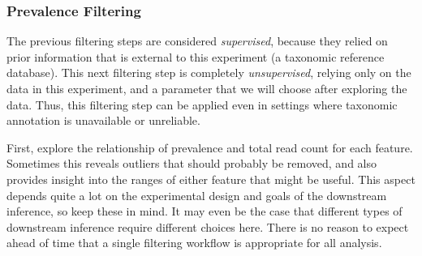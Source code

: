 \subsubsection*{Prevalence Filtering}

The previous filtering steps are considered \emph{supervised},
because they relied on prior information
that is external to this experiment
(a taxonomic reference database).
This next filtering step is completely \emph{unsupervised},
relying only on the data in this experiment,
and a parameter that we will choose after exploring the data.
Thus, this filtering step can be applied even in settings
where taxonomic annotation is unavailable or unreliable.

First, explore the relationship of
prevalence and total read count
for each feature.
Sometimes this reveals outliers that should probably be removed,
and also provides insight into the ranges of either feature
that might be useful.
This aspect depends quite a lot on the experimental design
and goals of the downstream inference,
so keep these in mind.
It may even be the case that different types of downstream inference
require different choices here.
There is no reason to expect ahead of time that
a single filtering workflow is appropriate for all analysis.


